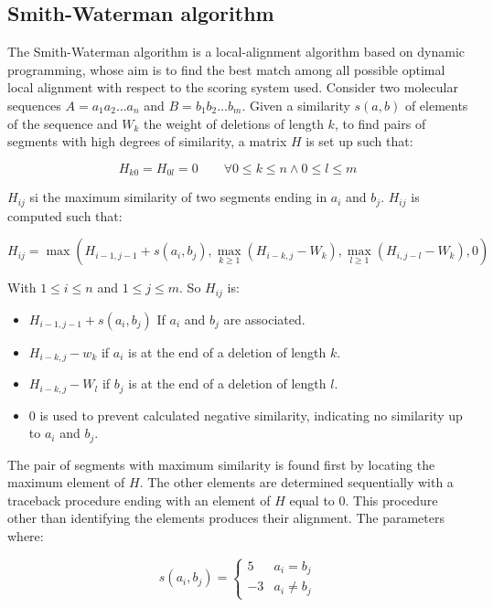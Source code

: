     \subsection{Smith-Waterman algorithm}
    The Smith-Waterman algorithm is a local-alignment algorithm based on dynamic programming, whose aim is to find the best match among all possible optimal local alignment with respect to the scoring system used.
    Consider two molecular sequences $A = a_1a_2\dots a_n$ and $B = b_1b_2\dots b_m$.
    Given a similarity $s(a,b)$ of elements of the sequence and $W_k$ the weight of deletions of length $k$, to find pairs of segments with high degrees of similarity, a matrix $H$ is set up such that:

    $$H_{k0} = H_{0l} = 0\qquad \forall 0\le k\le n\land 0\le l\le m$$

    $H_{ij}$ si the maximum similarity of two segments ending in $a_i$ and $b_j$.
    $H_{ij}$ is computed such that:

    $$H_{ij} = \max(H_{i-1, j-1} + s(a_i, b_j), \max\limits_{k\ge 1}(H_{i-k, j}-W_k), \max\limits_{l\ge 1}(H_{i, j-l}-W_k), 0)$$

    With $1\le i\le n$ and $1\le j\le m$.
    So $H_{ij}$ is:

    \begin{multicols}{2}
      \begin{itemize}
        \item $H_{i-1, j-1} + s(a_i, b_j)$ If $a_i$ and $b_j$ are associated.
        \item $H_{i-k, j}-w_k$ if $a_i$ is at the end of a deletion of length $k$.
        \item $H_{i-k, j}-W_l$ if $b_j$ is at the end of a deletion of length $l$.
        \item $0$ is used to prevent calculated negative similarity, indicating no similarity up to $a_i$ and $b_j$.
      \end{itemize}
    \end{multicols}

    The pair of segments with maximum similarity is found first by locating the maximum element of $H$.
    The other elements are determined sequentially with a traceback procedure ending with an element of $H$ equal to $0$.
    This procedure other than identifying the elements produces their alignment.
    The parameters  where:

    $$s(a_i, b_j) = \begin{cases} 5 & a_i = b_j \\ -3 & a_i\neq b_j\end{cases}$$


